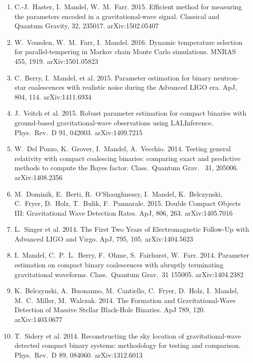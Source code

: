 \documentclass[margin,line]{res}
\begin{document}
\begin{resume}
\begin{enumerate}
\item  C.-J.~Haster, I.~Mandel,  W.~M.~Farr.  2015.  Efficient method for measuring the parameters encoded in a gravitational-wave signal.  Classical and Quantum Gravity, 32, 235017. arXiv:1502.05407

\item W.~Vousden, W.~M.~Farr, I.~Mandel.  2016. Dynamic temperature selection for parallel-tempering in Markov chain Monte Carlo simulations.  MNRAS 455, 1919. arXiv:1501.05823 

\item  C.~Berry, I.~Mandel, et al. 2015. Parameter estimation for binary neutron-star coalescences with realistic noise during the Advanced LIGO era.  ApJ, 804, 114.  arXiv:1411.6934

\item  J.~Veitch et al. 2015. Robust parameter estimation for compact binaries with ground-based gravitational-wave observations using LALInference. Phys.~Rev.~D 91, 042003. arXiv:1409.7215

\item  W.~Del Pozzo, K.~Grover, I.~Mandel, A.~Vecchio. 2014.  Testing general relativity with compact coalescing binaries: comparing exact and predictive methods to compute the Bayes factor. Class.~Quantum Grav.~ 31, 205006. arXiv:1408.2356

\item  M.~Dominik, E.~Berti, R.~O'Shaughnessy, I.~Mandel, K.~Belczynski, C.~Fryer, D.~Holz, T.~Bulik,  F.~Pannarale. 2015. Double Compact Objects III: Gravitational Wave Detection Rates.  ApJ, 806, 263.  arXiv:1405.7016

\item  L.~Singer et al. 2014. The First Two Years of Electromagnetic Follow-Up with Advanced LIGO and Virgo.  ApJ, 795, 105. arXiv:1404.5623

\item  I.~Mandel, C.~P.~L.~Berry, F.~Ohme, S.~Fairhurst, W.~Farr.  2014. Parameter estimation on compact binary coalescences with abruptly terminating gravitational waveforms.  Class.~Quantum Grav.~31 155005. arXiv:1404.2382

\item  K.~Belczynski, A.~Buonanno, M.~Cantiello, C.~Fryer, D.~Holz, I.~Mandel, M.~C.~Miller, M.~Walczak.  2014. The Formation and Gravitational-Wave Detection of Massive Stellar Black-Hole Binaries.  ApJ 789, 120. arXiv:1403.0677

\item  T.~Sidery et al. 2014. Reconstructing the sky location of gravitational-wave detected compact binary systems: methodology for testing and comparison.  Phys.~Rev.~D 89, 084060.  arXiv:1312.6013


\end{enumerate}
\end{resume}
\end{document}
